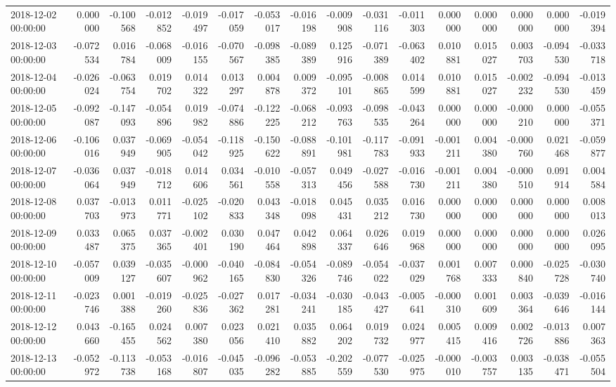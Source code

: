 \begin{tabular}{lrrrrrrrrrrrrrrr}
2018-12-02 00:00:00 & 0.000000 & -0.100568 & -0.012852 & -0.019497 & -0.017059 & -0.053017 & -0.016198 & -0.009908 & -0.031116 & -0.011303 & 0.000000 & 0.000000 & 0.000000 & 0.000000 & -0.019394 \\
2018-12-03 00:00:00 & -0.072534 & 0.016784 & -0.068009 & -0.016155 & -0.070567 & -0.098385 & -0.089389 & 0.125916 & -0.071389 & -0.063402 & 0.010881 & 0.015027 & 0.003703 & -0.094530 & -0.033718 \\
2018-12-04 00:00:00 & -0.026024 & -0.063754 & 0.019702 & 0.014322 & 0.013297 & 0.004878 & 0.009372 & -0.095101 & -0.008865 & 0.014599 & 0.010881 & 0.015027 & -0.002232 & -0.094530 & -0.013459 \\
2018-12-05 00:00:00 & -0.092087 & -0.147093 & -0.054896 & 0.019982 & -0.074886 & -0.122225 & -0.068212 & -0.093763 & -0.098535 & -0.043264 & 0.000000 & 0.000000 & -0.000210 & 0.000000 & -0.055371 \\
2018-12-06 00:00:00 & -0.106016 & 0.037949 & -0.069905 & -0.054042 & -0.118925 & -0.150622 & -0.088891 & -0.101981 & -0.117783 & -0.091933 & -0.001211 & 0.004380 & -0.000760 & 0.021468 & -0.059877 \\
2018-12-07 00:00:00 & -0.036064 & 0.037949 & -0.018712 & 0.014606 & 0.034561 & -0.010558 & -0.057313 & 0.049456 & -0.027588 & -0.016730 & -0.001211 & 0.004380 & -0.000510 & 0.091914 & 0.004584 \\
2018-12-08 00:00:00 & 0.037703 & -0.013973 & 0.011771 & -0.025102 & -0.020833 & 0.043348 & -0.018098 & 0.045431 & 0.035212 & 0.016730 & 0.000000 & 0.000000 & 0.000000 & 0.000000 & 0.008013 \\
2018-12-09 00:00:00 & 0.033487 & 0.065375 & 0.037365 & -0.002401 & 0.030190 & 0.047464 & 0.042898 & 0.064337 & 0.026646 & 0.019968 & 0.000000 & 0.000000 & 0.000000 & 0.000000 & 0.026095 \\
2018-12-10 00:00:00 & -0.057009 & 0.039127 & -0.035607 & -0.000962 & -0.040165 & -0.084830 & -0.054326 & -0.089746 & -0.054022 & -0.037029 & 0.001768 & 0.007333 & 0.000840 & -0.025728 & -0.030740 \\
2018-12-11 00:00:00 & -0.023746 & 0.001388 & -0.019260 & -0.025836 & -0.027362 & 0.017281 & -0.034241 & -0.030185 & -0.043427 & -0.005641 & -0.000310 & 0.001609 & 0.003364 & -0.039646 & -0.016144 \\
2018-12-12 00:00:00 & 0.043660 & -0.165455 & 0.024562 & 0.007380 & 0.023056 & 0.021410 & 0.035882 & 0.064202 & 0.019732 & 0.024977 & 0.005415 & 0.009416 & 0.002726 & -0.013886 & 0.007363 \\
2018-12-13 00:00:00 & -0.052972 & -0.113738 & -0.053168 & -0.016807 & -0.045035 & -0.096282 & -0.053885 & -0.202559 & -0.077530 & -0.025975 & -0.000010 & -0.003757 & 0.003135 & -0.038471 & -0.055504 \\

\end{tabular}

